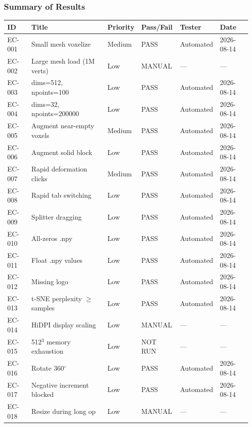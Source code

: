 \documentclass[12pt,a4paper]{article}
\begin{document}
\subsubsection{Summary of Results}
\begin{longtable}{p{1.2cm}p{5.6cm}p{1.5cm}p{1.6cm}p{1.4cm}p{2cm}}
\toprule
\textbf{ID} & \textbf{Title} & \textbf{Priority} & \textbf{Pass/Fail} & \textbf{Tester} & \textbf{Date} \\
\midrule
EC-001 & Small mesh voxelize          & Medium & PASS   & Automated & 2026-08-14 \\
EC-002 & Large mesh load (1M verts)   & Low    & MANUAL & ---       & ---         \\
EC-003 & dims=512, npoints=100        & Low    & PASS   & Automated & 2026-08-14 \\
EC-004 & dims=32, npoints=200000      & Low    & PASS   & Automated & 2026-08-14 \\
EC-005 & Augment near-empty voxels    & Medium & PASS   & Automated & 2026-08-14 \\
EC-006 & Augment solid block          & Low    & PASS   & Automated & 2026-08-14 \\
EC-007 & Rapid deformation clicks     & Medium & PASS   & Automated & 2026-08-14 \\
EC-008 & Rapid tab switching          & Low    & PASS   & Automated & 2026-08-14 \\
EC-009 & Splitter dragging            & Low    & PASS   & Automated & 2026-08-14 \\
EC-010 & All-zeros .npy               & Low    & PASS   & Automated & 2026-08-14 \\
EC-011 & Float .npy values            & Low    & PASS   & Automated & 2026-08-14 \\
EC-012 & Missing logo                 & Low    & PASS   & Automated & 2026-08-14 \\
EC-013 & t-SNE perplexity $\geq$ samples & Low & PASS & Automated & 2026-08-14 \\
EC-014 & HiDPI display scaling        & Low    & MANUAL & ---       & ---         \\
EC-015 & 512$^3$ memory exhaustion    & Low    & NOT RUN & ---       & ---         \\
EC-016 & Rotate 360$^\circ$           & Low    & PASS   & Automated & 2026-08-14 \\
EC-017 & Negative increment blocked   & Low    & PASS   & Automated & 2026-08-14 \\
EC-018 & Resize during long op        & Low    & MANUAL & ---       & ---         \\
\bottomrule
\end{longtable}
\end{document}
